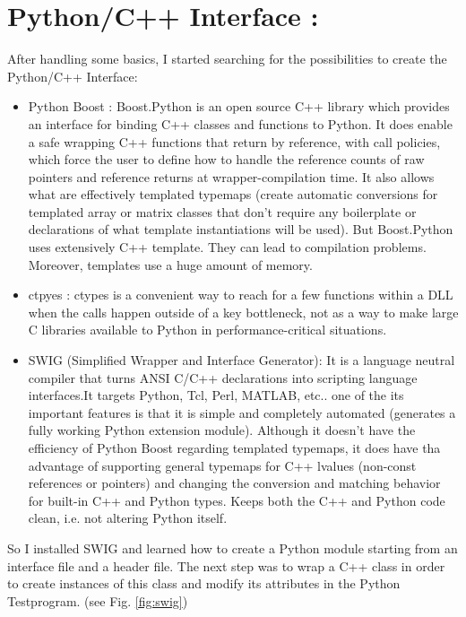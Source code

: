 \section{Python/C++ Interface :}
After handling some basics, I started searching for the possibilities to create the Python/C++ Interface:\\
\begin{itemize}
\item Python Boost : Boost.Python is an open source C++ library which provides an interface for binding C++ classes and functions to Python. It does enable a safe wrapping C++ functions that return by reference, with call policies, which force the user to define how to handle the reference counts of raw pointers and reference returns at wrapper-compilation time. It also allows what are effectively templated typemaps (create automatic conversions for templated array or matrix classes that don't require any boilerplate or declarations of what template instantiations will be used). But Boost.Python uses extensively C++ template. They can lead to compilation problems. Moreover, templates use a huge amount of memory. \\
\item ctpyes : ctypes is a convenient way to reach for a few functions within a DLL when the calls happen outside of a key bottleneck, not as a way to make large C libraries available to Python in performance-critical situations.\\
\item SWIG (Simplified Wrapper and Interface Generator): It is a language neutral compiler that turns ANSI C/C++ declarations into scripting language interfaces.It targets Python, Tcl, Perl, MATLAB, etc..
one of the its important features is that it is simple and completely automated (generates a fully working Python extension module).
Although it doesn't have the efficiency of Python Boost regarding  templated typemaps, it does have tha advantage of supporting general typemaps for C++ lvalues (non-const references or pointers) and changing the conversion and matching behavior for built-in C++ and Python types. Keeps both the C++ and Python code clean, i.e. not altering Python itself.\\
\end{itemize}
So I installed SWIG and learned how to create a Python module starting from an interface file and a header file. The next step was to wrap a C++ class in order to create instances of this class and modify its attributes in the Python Testprogram. (see Fig. \ref{fig:swig})\\
